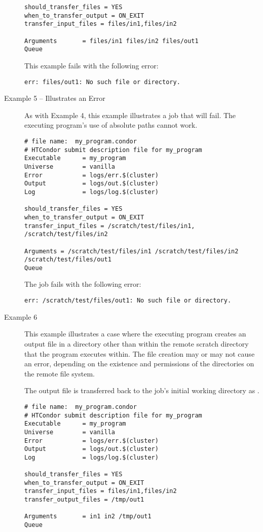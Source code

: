 \begin{description}
\begin{verbatim}
should_transfer_files = YES
when_to_transfer_output = ON_EXIT
transfer_input_files = files/in1,files/in2

Arguments       = files/in1 files/in2 files/out1
Queue
\end{verbatim}
\normalsize

This example fails with the following error:
\footnotesize
\begin{verbatim}
err: files/out1: No such file or directory.
\end{verbatim}
\normalsize

\item[Example 5 -- Illustrates an Error]

As with Example 4,
this example illustrates a job that will fail.
The executing program's use of 
absolute paths cannot work.

\footnotesize
\begin{verbatim}
# file name:  my_program.condor
# HTCondor submit description file for my_program
Executable      = my_program
Universe        = vanilla
Error           = logs/err.$(cluster)
Output          = logs/out.$(cluster)
Log             = logs/log.$(cluster)

should_transfer_files = YES
when_to_transfer_output = ON_EXIT
transfer_input_files = /scratch/test/files/in1, /scratch/test/files/in2

Arguments = /scratch/test/files/in1 /scratch/test/files/in2 /scratch/test/files/out1
Queue
\end{verbatim}
\normalsize

The job fails with the following error:
\footnotesize
\begin{verbatim}
err: /scratch/test/files/out1: No such file or directory.
\end{verbatim}
\normalsize

\item[Example 6]

This example illustrates a case
where the executing program creates an output file in a directory
other than within the remote scratch directory that the 
program executes within.
The file creation may or may not cause an error,
depending on the existence and permissions
of the directories on the remote file system.

The output file  is transferred back to the job's
initial working directory as .

\footnotesize
\begin{verbatim}
# file name:  my_program.condor
# HTCondor submit description file for my_program
Executable      = my_program
Universe        = vanilla
Error           = logs/err.$(cluster)
Output          = logs/out.$(cluster)
Log             = logs/log.$(cluster)

should_transfer_files = YES
when_to_transfer_output = ON_EXIT
transfer_input_files = files/in1,files/in2
transfer_output_files = /tmp/out1

Arguments       = in1 in2 /tmp/out1
Queue
\end{verbatim}
\normalsize

\end{description}

